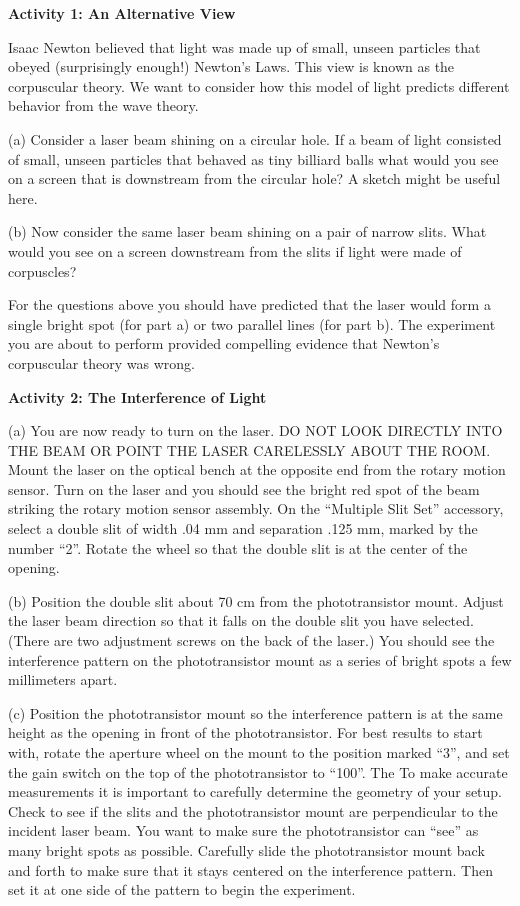 \textbf{Activity 1: An Alternative View}

Isaac Newton believed that light was made up of small, unseen particles
that obeyed (surprisingly enough!) Newton's Laws. This view is known
as the corpuscular theory. We want to consider how this model of light
predicts different behavior from the wave theory.

\vspace{35mm}
(a) Consider a laser beam shining on a circular hole. If a beam of
light consisted of small, unseen particles that behaved as tiny billiard
balls what would you see on a screen that is downstream from the circular
hole? A sketch might be useful here.
\answerspace{30mm}

(b) Now consider the same laser beam shining on a pair of narrow slits.
What would you see on a screen downstream from the slits if light
were made of corpuscles?
\answerspace{30mm}

For the questions above you should have predicted that the laser would
form a single bright spot (for part a) or two parallel lines (for part
b). The experiment you are about to perform provided compelling evidence
that Newton's corpuscular theory was wrong. 

\textbf{Activity 2: The Interference of Light }

(a) You are now ready to turn on the laser. DO NOT LOOK DIRECTLY INTO
THE BEAM OR POINT THE LASER CARELESSLY ABOUT THE ROOM. Mount the laser on the 
optical bench at the opposite end from the rotary motion sensor. Turn on the
laser and you should see the bright red spot of the beam striking
the rotary motion sensor assembly. On the ``Multiple Slit Set'' accessory, 
select a double slit of width .04 mm and separation .125 mm, marked by the number ``2''. Rotate the 
wheel so that the double slit is at the center of the opening.

(b) Position the double slit about 70 cm from the phototransistor mount. Adjust 
the laser beam direction so that it falls on the double slit you have selected. 
(There are two adjustment screws on the back of the laser.) 
You should see the interference pattern on the phototransistor mount as a series of bright spots a few millimeters apart. 

(c) Position the phototransistor mount so the interference pattern
is at the same height as the opening in front of the phototransistor. For best results to start with, rotate the aperture wheel on the mount to the position marked ``3'', and set the gain switch on the top of the phototransistor to ``100''. The To make accurate measurements it is important to carefully determine the geometry of your setup. Check to see if the slits and the phototransistor mount are perpendicular to the incident
laser beam.  You want to make sure the phototransistor can ``see'' as many
bright spots as possible. Carefully slide the phototransistor mount back and forth to make sure that it stays centered on the interference pattern. Then set it 
at one side of the pattern to begin the experiment.

